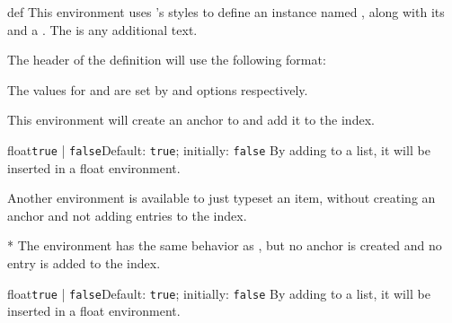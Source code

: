 \documentclass[11pt, outputdir = ./out]{article}
\begin{document}
\begin{Environmentenv}{def}{}{}
    \label{environmentdef}
    This environment uses 's styles to define an instance named , along with its  and a . The  is any additional text.

    The header of the definition will use the following format:


    The values for  and  are set by  and  options respectively.

    This environment will create an anchor to  and add it to the index.
\end{Environmentenv}


\begin{example}{}
    \begin{EnumItemOptiondef}{float}{\texttt{true} | \texttt{false}}{Default: \texttt{true}; initially: \texttt{false}}
        By adding  to a list, it will be inserted in a float environment.
    \end{EnumItemOptiondef}
\end{example}

Another environment is available to just typeset an item, without creating an anchor and not adding entries to the index.

\begin{Environmentenv}{*}{}{}
    The  environment has the same behavior as , but no anchor is created and no entry is added to the index.
\end{Environmentenv}

\begin{example}{}
    \begin{EnumItemOption*}{float}{\texttt{true} | \texttt{false}}{Default: \texttt{true}; initially: \texttt{false}}
        By adding  to a list, it will be inserted in a float environment.
    \end{EnumItemOption*}
\end{example}
\end{document}
